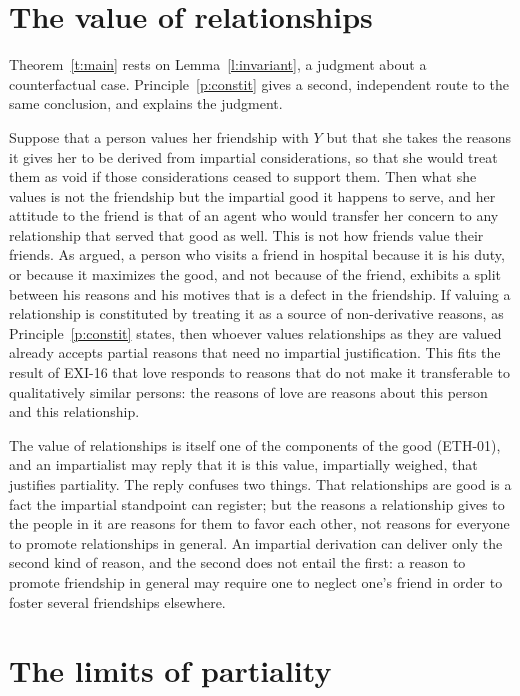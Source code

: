 \documentclass{situationist-preprint}
\begin{document}
\section{The value of relationships}

Theorem~\ref{t:main} rests on Lemma~\ref{l:invariant}, a judgment about a counterfactual case. Principle~\ref{p:constit} gives a second, independent route to the same conclusion, and explains the judgment.

Suppose that a person values her friendship with $Y$ but that she takes the reasons it gives her to be derived from impartial considerations, so that she would treat them as void if those considerations ceased to support them. Then what she values is not the friendship but the impartial good it happens to serve, and her attitude to the friend is that of an agent who would transfer her concern to any relationship that served that good as well. This is not how friends value their friends. As \citet{Stocker1976} argued, a person who visits a friend in hospital because it is his duty, or because it maximizes the good, and not because of the friend, exhibits a split between his reasons and his motives that is a defect in the friendship. If valuing a relationship is constituted by treating it as a source of non-derivative reasons, as Principle~\ref{p:constit} states, then whoever values relationships as they are valued already accepts partial reasons that need no impartial justification. This fits the result of EXI-16 that love responds to reasons that do not make it transferable to qualitatively similar persons: the reasons of love are reasons about this person and this relationship.

The value of relationships is itself one of the components of the good (ETH-01), and an impartialist may reply that it is this value, impartially weighed, that justifies partiality. The reply confuses two things. That relationships are good is a fact the impartial standpoint can register; but the reasons a relationship gives to the people in it are reasons for them to favor each other, not reasons for everyone to promote relationships in general. An impartial derivation can deliver only the second kind of reason, and the second does not entail the first: a reason to promote friendship in general may require one to neglect one's friend in order to foster several friendships elsewhere.

\section{The limits of partiality}
\end{document}
